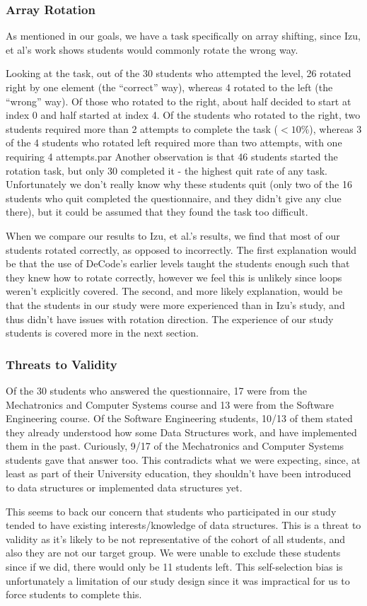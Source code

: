 \documentclass[11pt]{article}
\begin{document}
\subsubsection{Array Rotation}
As mentioned in our goals, we have a task specifically on array shifting, since Izu, et al\cite{izuloop}'s work shows students would commonly rotate the wrong way.\par
Looking at the task, out of the 30 students who attempted the level, 26 rotated right by one element (the ``correct'' way), whereas 4 rotated to the left (the ``wrong'' way). Of those who rotated to the right, about half decided to start at index 0 and half started at index 4. Of the students who rotated to the right, two students required more than 2 attempts to complete the task ($<10\%$), whereas 3 of the 4 students who rotated left required more than two attempts, with one requiring 4 attempts.par
Another observation is that 46 students started the rotation task, but only 30 completed it - the highest quit rate of any task. Unfortunately we don't really know why these students quit (only two of the 16 students who quit completed the questionnaire, and they didn't give any clue there), but it could be assumed that they found the task too difficult.\par
When we compare our results to Izu, et al.\cite{izuloop}'s results, we find that most of our students rotated correctly, as opposed to incorrectly. The first explanation would be that the use of DeCode's earlier levels taught the students enough such that they knew how to rotate correctly, however we feel this is unlikely since loops weren't explicitly covered. The second, and more likely explanation, would be that the students in our study were more experienced than in Izu's study, and thus didn't have issues with rotation direction. The experience of our study students is covered more in the next section.
\subsubsection{Threats to Validity}
\label{studycohort}
Of the 30 students who answered the questionnaire, 17 were from the Mechatronics and Computer Systems course and 13 were from the Software Engineering course. Of the Software Engineering students, 10/13 of them stated they already understood how some Data Structures work, and have implemented them in the past. Curiously, 9/17 of the Mechatronics and Computer Systems students gave that answer too. This contradicts what we were expecting, since, at least as part of their University education, they shouldn't have been introduced to data structures or implemented data structures yet.\par
This seems to back our concern that students who participated in our study tended to have existing interests/knowledge of data structures. This is a threat to validity as it's likely to be not representative of the cohort of all students, and also they are not our target group. We were unable to exclude these students since if we did, there would only be 11 students left. This self-selection bias is unfortunately a limitation of our study design since it was impractical for us to force students to complete this.
\end{document}
